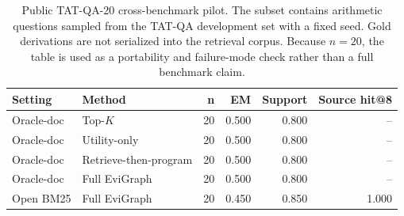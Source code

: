 \begin{table}[t]
\centering
\small
\begin{tabular}{llrrrr}
\toprule
Setting & Method & n & EM & Support & Source hit@8 \\
\midrule
Oracle-doc & Top-\(K\) & 20 & 0.500 & 0.800 & -- \\
Oracle-doc & Utility-only & 20 & 0.500 & 0.800 & -- \\
Oracle-doc & Retrieve-then-program & 20 & 0.500 & 0.800 & -- \\
Oracle-doc & Full EviGraph & 20 & 0.500 & 0.800 & -- \\
Open BM25 & Full EviGraph & 20 & 0.450 & 0.850 & 1.000 \\
\bottomrule
\end{tabular}
\caption{Public TAT-QA-20 cross-benchmark pilot. The subset contains arithmetic questions sampled from the TAT-QA development set with a fixed seed. Gold derivations are not serialized into the retrieval corpus. Because \(n=20\), the table is used as a portability and failure-mode check rather than a full benchmark claim.}
\label{tab:tatqa-pilot}
\end{table}
